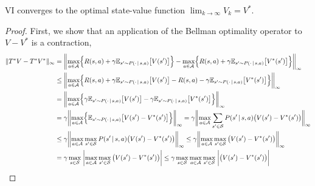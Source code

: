 		\begin{theorem}
			\ac{VI} converges to the optimal state-value function \( \lim_{k \to \infty} V_k = V^\ast \).
		\end{theorem}
		\begin{proof}
			First, we show that an application of the Bellman optimality operator to \(V - V^\ast\) is a contraction,
			\begin{align}
				\lVert T^\ast V - T^\ast V^\ast \rVert_\infty
				 & = \biggl\lVert \max_{a \in \mathcal{A}} \Bigl\{ R(s, a) + \gamma \E_{s' \sim P(\cdot \given s, a)}\bigl[ V(s') \bigr] \Bigr\} - \max_{a \in \mathcal{A}} \Bigl\{ R(s, a) + \gamma \E_{s' \sim P(\cdot \given s, a)}\bigl[ V^\ast(s') \bigr] \Bigr\} \biggr\rVert_\infty \\
				 & \leq \biggl\lVert \max_{a \in \mathcal{A}} \Bigl\{ R(s, a) + \gamma \E_{s' \sim P(\cdot \given s, a)}\bigl[ V(s') \bigr] - R(s, a) - \gamma \E_{s' \sim P(\cdot \given s, a)}\bigl[ V^\ast(s') \bigr] \Bigr\} \biggr\rVert_\infty                                       \\
				 & = \biggl\lVert \max_{a \in \mathcal{A}} \Bigl\{ \gamma \E_{s' \sim P(\cdot \given s, a)}\bigl[ V(s') \bigr] - \gamma \E_{s' \sim P(\cdot \given s, a)}\bigl[ V^\ast(s') \bigr] \Bigr\} \biggr\rVert_\infty                                                              \\
				 & = \gamma \biggl\lVert \max_{a \in \mathcal{A}} \Bigl\{ \E_{s' \sim P(\cdot \given s, a)}\bigl[ V(s') - V^\ast(s') \bigr] \Bigr\} \biggr\rVert_\infty
				= \gamma \biggl\lVert \max_{a \in \mathcal{A}} \sum_{s' \in \mathcal{S}} P(s' \given s, a) \bigl( V(s') - V^\ast(s') \bigr) \biggr\rVert_\infty                                                                                                                            \\
				 & \leq \gamma \biggl\lVert \max_{a \in \mathcal{A}} \max_{s' \in \mathcal{S}} P(s' \given s, a) \bigl( V(s') - V^\ast(s') \bigr) \biggr\rVert_\infty
				\leq \gamma \biggl\lVert \max_{a \in \mathcal{A}} \max_{s' \in \mathcal{S}} \, \bigl( V(s') - V^\ast(s') \bigr) \biggr\rVert_\infty                                                                                                                                        \\
				 & = \gamma \max_{s \in \mathcal{S}} \; \biggl\lvert \max_{a \in \mathcal{A}} \max_{s' \in \mathcal{S}} \, \bigl( V(s') - V^\ast(s') \bigr) \biggr\rvert
				\leq \gamma \max_{s \in \mathcal{S}} \max_{a \in \mathcal{A}} \max_{s' \in \mathcal{S}} \; \biggl\lvert \bigl( V(s') - V^\ast(s') \bigr) \biggr\rvert                                                                                                                      \\

\end{align}
\end{proof}
